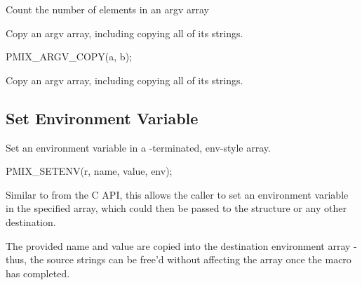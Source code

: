 \begin{arglist}
\end{arglist}

Count the number of elements in an argv array


Copy an argv array, including copying all of its strings.

\cspecificstart
\begin{codepar}
PMIX_ARGV_COPY(a, b);
\end{codepar}
\cspecificend

\begin{arglist}
\end{arglist}

Copy an argv array, including copying all of its strings.


\subsection{Set Environment Variable}

\summary

Set an environment variable in a -terminated, env-style array.

\cspecificstart
\begin{codepar}
PMIX_SETENV(r, name, value, env);
\end{codepar}
\cspecificend


\begin{arglist}
\end{arglist}

\descr

Similar to  from the C API, this allows the caller to set an environment variable in the specified  array, which could then be passed to the  structure or any other destination.

\adviceuserstart
The provided name and value are copied into the destination environment array - thus, the source strings can be free'd without affecting the array once the macro has completed.
\adviceuserend


